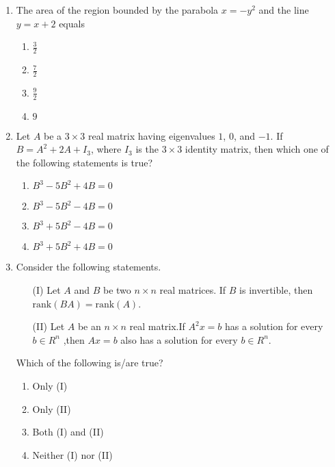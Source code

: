 \documentclass[journal,12pt,onecolumn]{IEEEtran}
\theoremstyle{remark}
\begin{document}
\begin{enumerate}
    \item The area of the region bounded by the parabola $x = -y^2$ and the line $y = x + 2$ equals
    \begin{enumerate}
        \item $\frac{3}{2}$
        \item $\frac{7}{2}$
        \item $\frac{9}{2}$
        \item $9$
    \end{enumerate}

    \item Let $A$ be a $3 \times 3$ real matrix having eigenvalues $1$, $0$, and $-1$. If $B = A^2 + 2A + I_3$, where $I_3$ is the $3 \times 3$ identity matrix, then which one of the following statements is true?
    \begin{enumerate}
        \item $B^3 - 5B^2 + 4B = 0$
        \item $B^3 - 5B^2 - 4B = 0$
        \item $B^3 + 5B^2 - 4B = 0$
        \item $B^3 + 5B^2 + 4B = 0$
    \end{enumerate}

    \item Consider the following statements.
    \begin{enumerate}
    \item[(I)] Let $A$ and $B$ be two $n \times n$ real matrices. If $B$ is invertible, then $\text{rank}(BA) = \text{rank}(A)$.
    \item[(II)] Let $A$ be an $n \times n$ real matrix.If $A^2x=b$ has a solution for every $b\in R^n$ ,then $Ax=b$ also has a solution for every $b\in R^n$.
    \end{enumerate}

    Which of the following is/are true?
    \begin{enumerate}
        \item Only (I)
        \item Only (II)
        \item Both (I) and (II)
        \item Neither (I) nor (II)
    \end{enumerate}

\end{enumerate}
\end{document}
